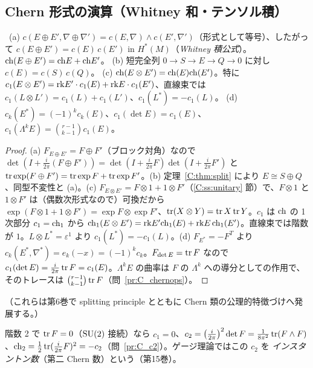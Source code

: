 \subsection{Chern 形式の演算（Whitney 和・テンソル積）}
\begin{prop}\label{C:prop:chernops}\tP\
(a) $c(E\oplus E',\nabla\oplus\nabla')=c(E,\nabla)\wedge c(E',\nabla')$（形式として等号）、したがって $c(E\oplus E')=c(E)\,c(E')$ in $H^*(M)$（\emph{Whitney 積公式}）。$\mathrm{ch}(E\oplus E')=\mathrm{ch} E+\mathrm{ch} E'$。
(b) 短完全列 $0\to S\to E\to Q\to0$ に対し $c(E)=c(S)\,c(Q)$。
(c) $\mathrm{ch}(E\otimes E')=\mathrm{ch}(E)\mathrm{ch}(E')$。特に $c_1(E\otimes E')=\mathrm{rk} E'\cdot c_1(E)+\mathrm{rk} E\cdot c_1(E')$、直線束では $c_1(L\otimes L')=c_1(L)+c_1(L')$、$c_1(L^*)=-c_1(L)$。
(d) $c_k(E^*)=(-1)^kc_k(E)$、$c_1(\det E)=c_1(E)$、$c_1(\Lambda^kE)=\binom{r-1}{k-1}c_1(E)$。
\end{prop}
\begin{proof}
(a) $F_{E\oplus E'}=F\oplus F'$（ブロック対角）なので $\det(I+\frac i{2\pi}(F\oplus F'))=\det(I+\frac i{2\pi}F)\det(I+\frac i{2\pi}F')$ と $\operatorname{tr}\exp(F\oplus F')=\operatorname{tr}\exp F+\operatorname{tr}\exp F'$。(b) 定理~\ref{C:thm:split} により $E\cong S\oplus Q$、同型不変性と (a)。(c) $F_{E\otimes E'}=F\otimes1+1\otimes F'$（\ref{C:ss:unitary} 節）で、$F\otimes1$ と $1\otimes F'$ は（偶数次形式なので）可換だから $\exp(F\otimes1+1\otimes F')=\exp F\otimes\exp F'$、$\operatorname{tr}(X\otimes Y)=\operatorname{tr} X\operatorname{tr} Y$。$c_1$ は $\mathrm{ch}$ の 1 次部分 $c_1=\mathrm{ch}_1$ から $\mathrm{ch}_1(E\otimes E')=\mathrm{rk} E'\mathrm{ch}_1(E)+\mathrm{rk} E\,\mathrm{ch}_1(E')$。直線束では階数が $1$。$L\otimes L^*=\varepsilon^1$ より $c_1(L^*)=-c_1(L)$。(d) $F_{E^*}=-F^T$ より $c_k(E^*,\nabla^*)=e_k(-x)=(-1)^kc_k$。$F_{\det E}=\operatorname{tr} F$ なので $c_1(\det E)=\frac i{2\pi}\operatorname{tr} F=c_1(E)$。$\Lambda^kE$ の曲率は $F$ の $\Lambda^k$ への導分としての作用で、そのトレースは $\binom{r-1}{k-1}\operatorname{tr} F$（問~\ref{pr:C_chernops}）。
\end{proof}
（これらは第6巻で splitting principle とともに Chern 類の公理的特徴づけへ発展する。）

\begin{ex}\label{C:ex:c2}
階数 2 で $\operatorname{tr} F=0$（$\mathrm{SU}(2)$ 接続）なら $c_1=0$、$c_2=\bigl(\frac i{2\pi}\bigr)^2\det F=\frac1{8\pi^2}\operatorname{tr}(F\wedge F)$、$\mathrm{ch}_2=\frac12\operatorname{tr}(\frac i{2\pi}F)^2=-c_2$（問~\ref{pr:C_c2}）。ゲージ理論ではこの $c_2$ を \emph{インスタントン数}（第二 Chern 数）という（第15巻）。
\end{ex}

